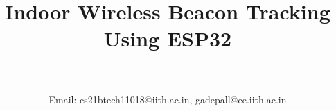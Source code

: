 \documentclass[conference]{IEEEtran}
\DeclareMathOperator*{\Res}{Res}
\begin{document}
\newtheorem{theorem}{Theorem}[section]
\newtheorem{problem}{Problem}
\newtheorem{proposition}{Proposition}[section]
\newtheorem{lemma}{Lemma}[section]
\newtheorem{corollary}[theorem]{Corollary}
\newtheorem{example}{Example}[section]
\newtheorem{definition}[problem]{Definition}
\newcommand{\BEQA}{\begin{eqnarray}}
\newcommand{\EEQA}{\end{eqnarray}}
\newcommand{\define}{\stackrel{\triangle}{=}}
\providecommand{\mbf}{\mathbf}
\providecommand{\pr}[1]{\ensuremath{\Pr\left(#1\right)}}
\providecommand{\qfunc}[1]{\ensuremath{Q\left(#1\right)}}
\providecommand{\sbrak}[1]{\ensuremath{{}\left[#1\right]}}
\providecommand{\lsbrak}[1]{\ensuremath{{}\left[#1\right.}}
\providecommand{\rsbrak}[1]{\ensuremath{{}\left.#1\right]}}
\providecommand{\brak}[1]{\ensuremath{\left(#1\right)}}
\providecommand{\lbrak}[1]{\ensuremath{\left(#1\right.}}
\providecommand{\rbrak}[1]{\ensuremath{\left.#1\right)}}
\providecommand{\cbrak}[1]{\ensuremath{\left\{#1\right\}}}
\providecommand{\lcbrak}[1]{\ensuremath{\left\{#1\right.}}
\providecommand{\rcbrak}[1]{\ensuremath{\left.#1\right\}}}
\theoremstyle{remark}
\newtheorem{rem}{Remark}
\newcommand{\sgn}{\mathop{\mathrm{sgn}}}
\providecommand{\abs}[1]{\left\vert#1\right\vert}
\providecommand{\res}[1]{\Res\displaylimits_{#1}} 
\providecommand{\norm}[1]{\left\lVert#1\right\rVert}
\providecommand{\mtx}[1]{\mathbf{#1}}
\providecommand{\mean}[1]{E\left[ #1 \right]}   
\providecommand{\fourier}{\overset{\mathcal{F}}{ \rightleftharpoons}}
\providecommand{\system}[1]{\overset{\mathcal{#1}}{ \longleftrightarrow}}
\newcommand{\solution}{\noindent \textbf{Solution: }}
\newcommand{\cosec}{\,\text{cosec}\,}
\providecommand{\dec}[2]{\ensuremath{\overset{#1}{\underset{#2}{\gtrless}}}}
\newcommand{\myvec}[1]{\ensuremath{\begin{pmatrix}#1\end{pmatrix}}}
\newcommand{\mydet}[1]{\ensuremath{\begin{vmatrix}#1\end{vmatrix}}}
\renewcommand{\vec}[1]{\boldsymbol{\mathbf{#1}}}
\def\putbox#1#2#3{\makebox[0in][l]{\makebox[#1][l]{}\raisebox{\baselineskip}[0in][0in]{\raisebox{#2}[0in][0in]{#3}}}}
     \def\rightbox#1{\makebox[0in][r]{#1}}
     \def\centbox#1{\makebox[0in]{#1}}
     \def\topbox#1{\raisebox{-\baselineskip}[0in][0in]{#1}}
     \def\midbox#1{\raisebox{-0.5\baselineskip}[0in][0in]{#1}}

\vspace{3cm}
\title{Indoor Wireless Beacon Tracking Using ESP32}
\author{
     \\
     \\
    Email: cs21btech11018@iith.ac.in, gadepall@ee.iith.ac.in
}
\maketitle
\bigskip
\end{document}
